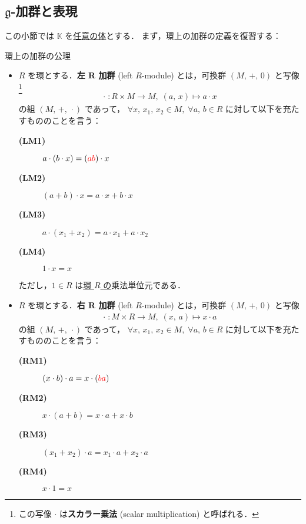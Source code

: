 \documentclass[rep_main]{subfiles}
\begin{document}
\subsection{$\mathfrak{g}$-加群と表現}

この小節では $\mathbb{K}$ を\underline{任意の体}とする．
まず，環上の加群の定義を復習する：

\begin{myaxiom}[label=ax:R-module,breakable]{環上の加群の公理}
	\begin{itemize}
		\item $R$ を環とする．\textbf{左 $\bm{R}$ 加群} (left $R$-module) とは，可換群 $(M,\, +,\, 0)$ と写像\footnote{この写像 $\cdot$ は\textbf{スカラー乗法} (scalar multiplication) と呼ばれる．}
		\begin{align}
			\cdot \; \colon R \times M \to M,\; (a,\, x) \mapsto a \cdot x
		\end{align}
		の組 $(M,\, +,\,\cdot\mathrel{})$ であって， $\forall x,\, x_1,\, x_2 \in M,\; \forall a,\, b \in R$ に対して以下を充たすもののことを言う：
		\begin{description}
			\item[\textbf{(LM1)}] $a \cdot (b \cdot x) = (\textcolor{red}{ab}) \cdot x$
			\item[\textbf{(LM2)}] $(a+b) \cdot x = a \cdot x + b \cdot x$
			\item[\textbf{(LM3)}] $a \cdot (x_1 + x_2) = a \cdot x_1 + a\cdot x_2$
			\item[\textbf{(LM4)}] $1 \cdot x = x$
		\end{description}
		ただし，$1 \in R$ は\underline{環 $R$ の}乗法単位元である．
		\item $R$ を環とする．\textbf{右 $\bm{R}$ 加群} (left $R$-module) とは，可換群 $(M,\, +,\, 0)$ と写像
		\begin{align}
			\cdot \; \colon M \times R \to M,\; (x,\, a) \mapsto x \cdot a
		\end{align}
		の組 $(M,\, +,\,\cdot\mathrel{})$ であって， $\forall x,\, x_1,\, x_2 \in M,\; \forall a,\, b \in R$ に対して以下を充たすもののことを言う：
		\begin{description}
			\item[\textbf{(RM1)}] $(x \cdot b) \cdot a = x \cdot (\textcolor{red}{ba})$
			\item[\textbf{(RM2)}] $x \cdot (a+b) = x \cdot a + x \cdot b$
			\item[\textbf{(RM3)}] $(x_1 + x_2) \cdot a = x_1 \cdot a + x_2 \cdot a$
			\item[\textbf{(RM4)}] $x \cdot 1 = x$

\end{description}
\end{itemize}
\end{myaxiom}
\end{document}
